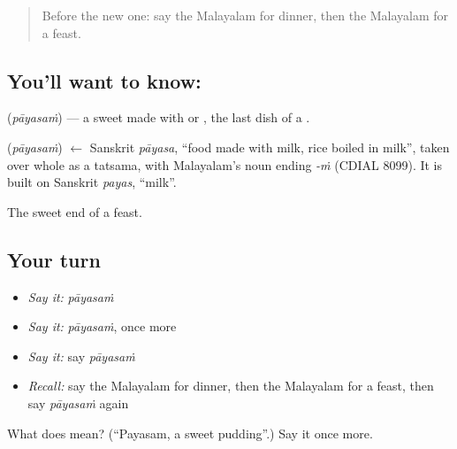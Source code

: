 \label{lesson:ML-C130-payasam}



\begin{quote}
Before the new one: say the Malayalam for dinner, then the Malayalam for a feast.
\end{quote}

\subsection*{You'll want to know: }
\textbf{} (\emph{pāyasaṁ}) — a sweet made with \textbf{} or \textbf{}, the last dish of a \textbf{}.

\begin{cousinweb}
\textbf{} (\emph{pāyasaṁ}) $\leftarrow$ Sanskrit \emph{pāyasa}, \textquotedblleft{}food made with milk, rice boiled in milk\textquotedblright{}, taken over whole as a tatsama, with Malayalam's noun ending \emph{-ṁ} (CDIAL 8099). It is built on Sanskrit \emph{payas}, \textquotedblleft{}milk\textquotedblright{}.
\end{cousinweb}

\begin{grammarlens}[title={What you've built}]
The sweet end of a feast.
\end{grammarlens}

\subsection*{Your turn}
\begin{itemize}
\raggedright
  \item \emph{Say it:} \emph{pāyasaṁ}
  \item \emph{Say it:} \emph{pāyasaṁ}, once more
  \item \emph{Say it:} say \emph{pāyasaṁ}
  \item \emph{Recall:} say the Malayalam for dinner, then the Malayalam for a feast, then say \emph{pāyasaṁ} again
\end{itemize}

\begin{tcolorbox}[breakable,colback=teal!4,colframe=teal!35!black,title={Before you move on}]
What does  mean? (\textquotedblleft{}Payasam, a sweet pudding\textquotedblright{}.) Say it once more.
\end{tcolorbox}
